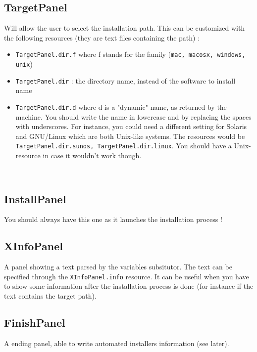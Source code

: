 \subsection{TargetPanel}

Will allow the user to select the installation path. This can be customized with
the following resources (they are text files containing the path) :
\begin{itemize}

  \item \texttt{TargetPanel.dir.f} where f stands for the family (\texttt{mac,
  macosx, windows, unix})
  \item \texttt{TargetPanel.dir} : the directory name, instead of the software
  to install name
  \item \texttt{TargetPanel.dir.d} where d is a "dynamic" name, as returned by
  the \Java machine. You should write the name in lowercase and by replacing the
  spaces with underscores. For instance, you could need a different setting for
  Solaris and GNU/Linux which are both Unix-like systems. The resources would be
  \texttt{TargetPanel.dir.sunos, TargetPanel.dir.linux}. You should have a
  Unix-resource in case it wouldn't work though.

\end{itemize}\

\subsection{InstallPanel}

You should always have this one as it launches the installation process !\\

\subsection{XInfoPanel}

A panel showing a text parsed by the variables subsitutor. The text can be
specified through the \texttt{XInfoPanel.info} resource. It can be useful when
you have to show some information after the installation process is done (for
instance if the text contains the target path).\\

\subsection{FinishPanel}

A ending panel, able to write automated installers information (see later).\\ 
